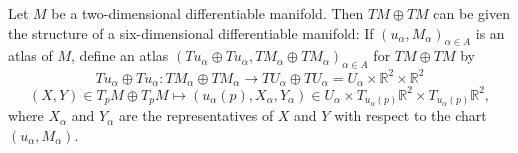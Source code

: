 Let $M$ be a two-dimensional differentiable manifold. Then $TM \oplus TM$ can be given the structure of a six-dimensional differentiable manifold: If $(u_\alpha, M_\alpha)_{\alpha \in A}$ is an atlas of $M$, define an atlas $(Tu_\alpha \oplus Tu_\alpha, TM_\alpha \oplus TM_\alpha)_{\alpha \in A}$ for $TM \oplus TM$ by
$$Tu_\alpha \oplus Tu_\alpha: TM_\alpha \oplus TM_\alpha \to TU_\alpha \oplus TU_\alpha = U_\alpha \times \mathbb{R}^2 \times \mathbb{R}^2$$
$$(X, Y) \in T_pM \oplus T_pM \mapsto (u_\alpha(p), X_\alpha, Y_\alpha) \in U_\alpha \times T_{u_\alpha(p)}\mathbb{R}^2 \times T_{u_\alpha(p)}\mathbb{R}^2,$$
where $X_\alpha$ and $Y_\alpha$ are the representatives of $X$ and $Y$ with respect to the chart $(u_\alpha, M_\alpha)$.
